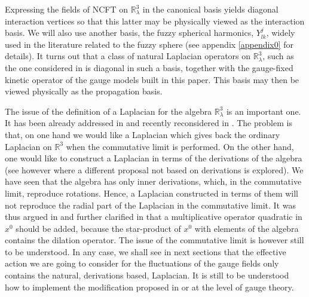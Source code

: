 \documentclass[a4paper,11pt]{article}
\numberwithin{equation}{section}
\newcommand\Rl{\mathbb{R}^3_\lambda}
\newcommand\gR{{\mathbb R}}
\def\gR{{\mathbb R}}
\theoremstyle{nonumberplain}
\begin{document}
Expressing the fields of NCFT on $\Rl$ in the canonical basis yields diagonal interaction vertices so that this latter may be physically viewed as the interaction basis.
We will also use  another basis, the fuzzy spherical harmonics, $Y^j_{lk}$, widely used in the literature related to the fuzzy sphere (see  appendix \ref{appendix0} for details).  It turns  out that a class of natural Laplacian operators on $\mathbb{R}^3_\lambda$, such as the one considered in \cite{vit-wal-12} is diagonal in such a  basis, together with the  gauge-fixed kinetic operator of the gauge models built in this paper. This basis may then be viewed physically as the propagation basis. 

The issue of the definition of a Laplacian for the algebra $\Rl$ is an important one. It has been already addressed in \cite{vit-wal-12} and recently reconsidered in \cite{V14}. The problem is that,  on one hand we would like a Laplacian which gives back the ordinary Laplacian on $\gR^3$ when the commutative limit is performed. On the other hand, one would like to construct a Laplacian in terms of the derivations of the algebra (see however \cite{pres} where a different proposal not based on derivations is explored). We have seen that the algebra has only inner derivations, which, in the commutative limit, reproduce rotations. Hence, a Laplacian constructed in terms of them will not reproduce the radial part of the Laplacian in the commutative limit. It was thus argued in \cite{vit-wal-12} and further clarified in \cite{V14} that a multiplicative operator quadratic in $x^0$ should be added, because the star-product of $x^0$ with elements of the algebra contains the dilation operator. The issue of the commutative limit is however still to be understood.  In any case, we shall see in next sections that the effective action we are going to consider for the fluctuations of the gauge fields only contains the natural, derivations based,  Laplacian. It is still to be understood how to implement the modification proposed in \cite{vit-wal-12} or \cite{V14} at the level of gauge theory. 
\par 



\end{document}
